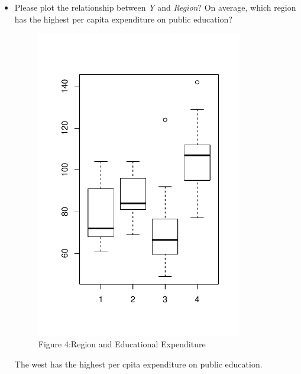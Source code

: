 \documentclass[12pt,letterpaper]{article}
\begin{document}
\begin{itemize}
		\item
		Please plot the relationship between \emph{Y} and \emph{Region}? On average, which region has the highest per capita expenditure on public education?
		\vspace{.5cm}
			  
		\vspace{.5cm}
	    \begin{figure}\centering
		\caption{Figure 4:Region and Educational Expenditure}
		\includegraphics[width=0.85\textwidth]{Rplot4.pdf}
	 \end{figure}	
		The west has the highest per cpita expenditure on public education.
		

\end{itemize}
\end{document}
